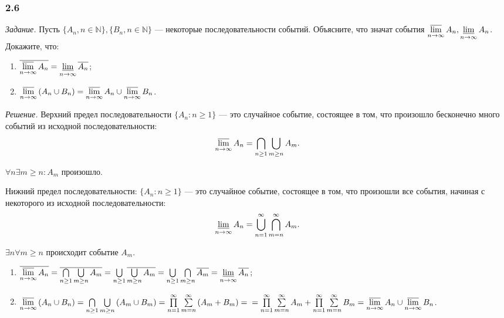\subsubsection*{2.6}

\textit{Задание.} Пусть $ \{ A_n, n \in \mathbb{N} \}, \{ B_n, n \in \mathbb{N} \} $ --- некоторые последовательности событий.
Объясните, что значат события $ \varlimsup \limits_{n \to \infty } A_n, \varliminf \limits_{n \to \infty } A_n$.
Докажите, что:
\begin{enumerate}[label=\alph*)]
\item $ \overline{ \varlimsup \limits_{ n \to \infty } A_n } =
\varliminf \limits_{ n \to \infty } \overline{ A_n }$;
\item $ \varlimsup \limits_{ n \to \infty } \left( A_n \cup B_n \right) =
\varlimsup \limits_{ n \to \infty } A_n \cup \varlimsup \limits_{ n \to \infty } B_n $.
\end{enumerate}

\textit{Решение.} Верхний предел последовательности $ \{ A_n : n \geq 1 \} $ ---
это случайное событие, состоящее в том, что произошло бесконечно много событий из исходной последовательности:
$$ \varlimsup \limits_{ n \to \infty } A_n =
\bigcap \limits_{ n \geq 1 } \bigcup \limits_{ m \geq n} A_m.$$

$ \forall n \exists m \geq n : A_m $ произошло.

Нижний предел последовательности:
$ \{ A_n : n \geq 1 \}$ --- это случайное событие, состоящее в том, что произошли все события, начиная с некоторого из исходной последовательности:
$$ \varliminf \limits_{ n \to \infty } A_n =
\bigcup \limits_{ n = 1 }^\infty \bigcap \limits_{ m = n }^\infty A_m.$$

$ \exists n \forall m \geq n $ происходит событие $A_m$.

\begin{enumerate}[label=\alph*)]
\item $\overline{ \varlimsup \limits_{ n \to \infty } A_n } =
\overline{ \bigcap \limits_{ n \geq 1} \bigcup \limits_{ m \geq n} A_m } =
\bigcup \limits_{ n \geq 1} \overline{ \bigcup \limits_{ m \geq n} A_m } =
\bigcup \limits_{ n \geq 1} \bigcap \limits_{ m \geq n} \overline{ A_m } =
\varliminf \limits_{ n \to \infty} \overline{ A_n }$;

\item $\varlimsup \limits_{ n \to \infty } \left( A_n \cup B_n \right) =
\bigcap \limits_{ n \geq 1} \bigcup \limits_{ m \geq n} \left( A_m \cup B_m \right) =
\prod \limits_{ n = 1 }^\infty \sum \limits_{ m = n }^\infty \left( A_m + B_m \right) = \\
= \prod \limits_{ n = 1 }^\infty \sum \limits_{ m = n }^\infty A_m + \prod \limits_{ n = 1 }^\infty \sum \limits_{ m = n }^\infty B_m =
\varlimsup \limits_{ n \to \infty } A_n \cup \varlimsup \limits_{ n \to \infty } B_n $.
\end{enumerate}

